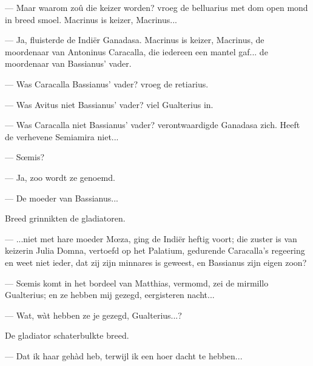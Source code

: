 \documentclass[a4paper, 12pt, oneside, dutch]{article}
\begin{document}
--- Maar waarom zoû die keizer worden? vroeg de belluarius met dom open mond in breed smoel. Macrinus is keizer, Macrinus...

--- Ja, fluisterde de Indiër Ganadasa. Macrinus is keizer, Macrinus, de moordenaar van Antoninus Caracalla, die iedereen een mantel gaf... de moordenaar van Bassianus' vader.

--- Was Caracalla Bassianus' vader? vroeg de retiarius.

--- Was Avitus niet Bassianus' vader? viel Gualterius in.

--- Was Caracalla niet Bassianus' vader? verontwaardigde Ganadasa zich. Heeft de verhevene Semiamira niet...

--- Sœmis?

--- Ja, zoo wordt ze genoemd.

--- De moeder van Bassianus...

Breed grinnikten de gladiatoren.

--- ...niet met hare moeder Mœza, ging de Indiër heftig voort; die zuster is van keizerin Julia Domna, vertoefd op het Palatium, gedurende Caracalla's regeering en weet niet ieder, dat zij zijn minnares is geweest, en Bassianus zijn eigen zoon?

--- Sœmis komt in het bordeel van Matthias, vermomd, zei de mirmillo Gualterius; en ze hebben mij gezegd, eergisteren nacht...

--- Wat, wàt hebben ze je gezegd, Gualterius...?

De gladiator schaterbulkte breed.

--- Dat ik haar gehàd heb, terwijl ik een hoer dacht te hebben...
\end{document}
